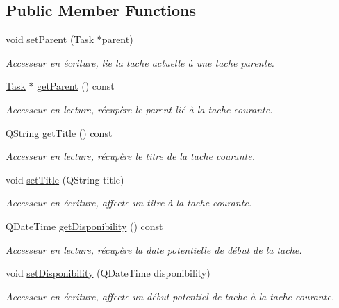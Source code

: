 \subsection*{Public Member Functions}
\begin{DoxyCompactItemize}
\item 
void \hyperlink{class_task_a4c16d78703f1fb014849a7c9c48f33f3}{set\+Parent} (\hyperlink{class_task}{Task} $\ast$parent)
\begin{DoxyCompactList}\small\item\em Accesseur en écriture, lie la tache actuelle à une tache parente. \end{DoxyCompactList}\item 
\hyperlink{class_task}{Task} $\ast$ \hyperlink{class_task_a5b31a480993cee5e7468e6fdf46970cc}{get\+Parent} () const 
\begin{DoxyCompactList}\small\item\em Accesseur en lecture, récupère le parent lié à la tache courante. \end{DoxyCompactList}\item 
Q\+String \hyperlink{class_task_a8d24d067d2558f8b9cd032670f7be0d4}{get\+Title} () const 
\begin{DoxyCompactList}\small\item\em Accesseur en lecture, récupère le titre de la tache courante. \end{DoxyCompactList}\item 
void \hyperlink{class_task_ad459be77e9e2f0df98d65a661fb5581b}{set\+Title} (Q\+String title)
\begin{DoxyCompactList}\small\item\em Accesseur en écriture, affecte un titre à la tache courante. \end{DoxyCompactList}\item 
Q\+Date\+Time \hyperlink{class_task_acf0a763d8b900e9536cc718b075c6837}{get\+Disponibility} () const 
\begin{DoxyCompactList}\small\item\em Accesseur en lecture, récupère la date potentielle de début de la tache. \end{DoxyCompactList}\item 
void \hyperlink{class_task_a564bd74ab3dbae672d1cfa41be993032}{set\+Disponibility} (Q\+Date\+Time disponibility)
\begin{DoxyCompactList}\small\item\em Accesseur en écriture, affecte un début potentiel de tache à la tache courante. \end{DoxyCompactList}\item 

\end{DoxyCompactItemize}
